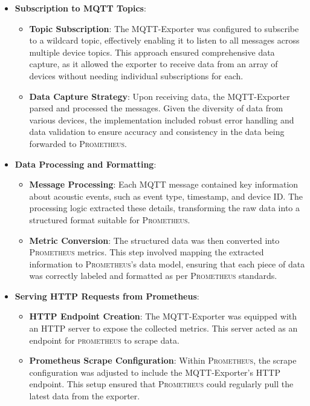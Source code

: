 \begin{itemize}
  \item \textbf{Subscription to MQTT Topics}: \begin{itemize}
          \item \textbf{Topic Subscription}: The MQTT-Exporter was configured to subscribe to a wildcard topic, effectively enabling it to listen to all messages across multiple device topics. This approach ensured comprehensive data capture, as it allowed the exporter to receive data from an array of devices without needing individual subscriptions for each.
          \item \textbf{Data Capture Strategy}: Upon receiving data, the MQTT-Exporter parsed and processed the messages. Given the diversity of data from various devices, the implementation included robust error handling and data validation to ensure accuracy and consistency in the data being forwarded to \textsc{Prometheus}.
        \end{itemize}
  \item \textbf{Data Processing and Formatting}: \begin{itemize}
          \item \textbf{Message Processing}: Each MQTT message contained key information about acoustic events, such as event type, timestamp, and device ID. The processing logic extracted these details, transforming the raw data into a structured format suitable for \textsc{Prometheus}.
          \item \textbf{Metric Conversion}: The structured data was then converted into \textsc{Prometheus} metrics. This step involved mapping the extracted information to \textsc{Prometheus}'s data model, ensuring that each piece of data was correctly labeled and formatted as per \textsc{Prometheus} standards.
        \end{itemize}
  \item \textbf{Serving HTTP Requests from Prometheus}: \begin{itemize}
          \item \textbf{HTTP Endpoint Creation}: The MQTT-Exporter was equipped with an HTTP server to expose the collected metrics. This server acted as an endpoint for \textsc{prometheus} to scrape data.
          \item \textbf{Prometheus Scrape Configuration}: Within \textsc{Prometheus}, the scrape configuration was adjusted to include the MQTT-Exporter's HTTP endpoint. This setup ensured that \textsc{Prometheus} could regularly pull the latest data from the exporter.

\end{itemize}
\end{itemize}
